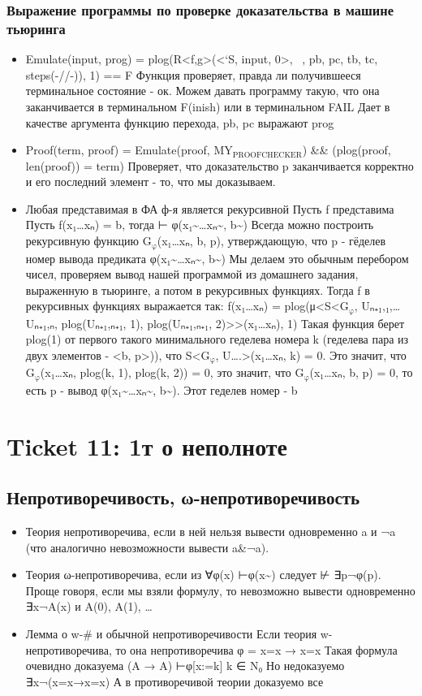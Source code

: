 \documentclass[11pt]{article}
\begin{document}
\subsubsection{Выражение программы по проверке доказательства в машине тьюринга}
\label{sec-12-5-2}
\begin{itemize}
\item Emulate(input, prog) = plog(R<f,g>(<`S, input, 0>,  , pb, pc, tb, tc, steps(-//-)), 1) == F
Функция проверяет, правда ли получившееся терминальное состояние - ок.
Можем давать программу такую, что она заканчивается в терминальном F(inish)
или в терминальном FAIL
Дает в качестве аргумента функцию перехода, pb, pc выражают prog
\item Proof(term, proof) = Emulate(proof, MY$_{\text{PROOFCHECKER}}$) \&\& (plog(proof, len(proof)) = term)
Проверяет, что доказательство p заканчивается корректно и его последний
элемент - то, что мы доказываем.
\item Любая представимая в ФА ф-я является рекурсивной
Пусть f представима
Пусть f(x₁\ldots{}xₙ) = b, тогда ⊢ φ(x₁\textasciitilde{}\ldots{}xₙ\textasciitilde{}, b\textasciitilde{})
Всегда можно построить рекурсивную функцию G$_{\text{φ}}$(x₁\ldots{}xₙ, b, p),
утверждающую, что p - гёделев номер вывода предиката φ(x₁\textasciitilde{}\ldots{}xₙ\textasciitilde{}, b\textasciitilde{})
Мы делаем это обычным перебором чисел, проверяем вывод нашей
программой из домашнего задания, выраженную в тьюринге, а потом в
рекурсивных функциях.
Тогда f в рекурсивных функциях выражается так:
f(x₁\ldots{}xₙ) = plog(μ<S<G$_{\text{φ}}$, Uₙ₊₁,₁,\ldots{} Uₙ₊₁,ₙ,
plog(Uₙ₊₁,ₙ₊₁, 1),
plog(Uₙ₊₁,ₙ₊₁, 2)>>(x₁\ldots{}xₙ), 1)
Такая функция берет plog(1) от первого такого минимального геделева
номера k (геделева пара из двух элементов - <b, p>)), что
S<G$_{\text{φ}}$, U\ldots{}.>(x₁\ldots{}xₙ, k) = 0. Это значит, что
G$_{\text{φ}}$(x₁\ldots{}xₙ, plog(k, 1), plog(k, 2)) = 0, это значит, что
G$_{\text{φ}}$(x₁\ldots{}xₙ, b, p) = 0, то есть p - вывод φ(x₁\textasciitilde{}\ldots{}xₙ\textasciitilde{}, b\textasciitilde{}).
Этот геделев номер - b
\end{itemize}
\section{Ticket 11: 1т о неполноте}
\label{sec-13}
\subsection{Непротиворечивость, ω-непротиворечивость}
\label{sec-13-1}
\begin{itemize}
\item Теория непротиворечива, если в ней нельзя вывести
одновременно a и ¬a (что аналогично невозможности
вывести a\&¬a).
\item Теория ω-непротиворечива, если из ∀φ(x) ⊢φ(x\textasciitilde{}) следует
⊬ ∃p¬φ(p). Проще говоря, если мы взяли
формулу, то невозможно вывести одновременно ∃x¬A(x)
и A(0), A(1), \ldots{}
\item Лемма о w-\# и обычной непротиворечивости
Если теория w-непротиворечива, то она непротиворечива
φ = x=x → x=x
Такая формула очевидно доказуема (A → A)
⊢φ[x:=k] k ∈ N₀
Но недоказуемо ∃x¬(x=x→x=x)
А в противоречивой теории доказуемо все
\end{itemize}
\end{document}
